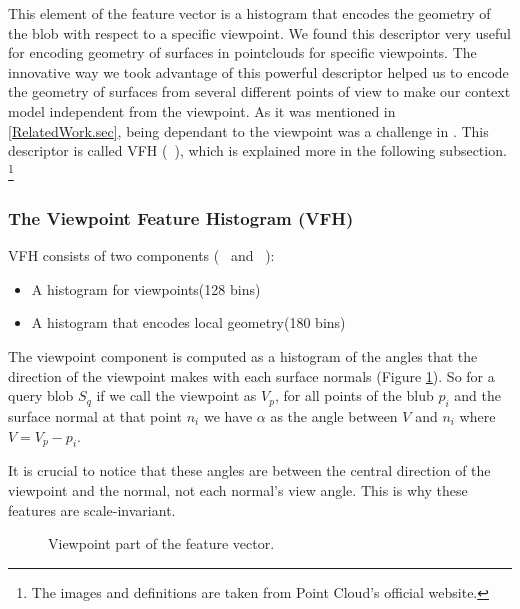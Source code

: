 This element of the feature vector is a histogram that encodes the geometry of the blob with respect to a specific viewpoint. We found this descriptor very useful for encoding geometry of surfaces in pointclouds for specific viewpoints. The innovative way we took advantage of this powerful descriptor helped us to encode the geometry of surfaces from several different points of view to make our context model independent from the viewpoint. As it was mentioned in \ref{RelatedWork.sec}, being dependant to the viewpoint was a challenge in \cite{aydemir2012_3Dcontext}.
This descriptor is called VFH (~\cite{5651280}), which is explained more in the following subsection. \footnote{The images and definitions are taken from Point Cloud's official website.}

\subsubsection*{The Viewpoint Feature Histogram (VFH)}
\label{VFH.ssec}
 

VFH consists of two components (~\cite{VFH_Definition} and ~\cite{5651280}):


\begin{itemize}
 \item A histogram for viewpoints(128 bins)
 \item A histogram that encodes local geometry(180 bins)
\end{itemize}

The viewpoint component is computed as a histogram of the angles that the direction of the viewpoint  makes with each surface
normals (Figure \ref{VFH_ViewPoint_component.figure}). So for a query blob $S_q$ if we call the viewpoint as $V_p$, for all points of the blub $p_i$ and the surface normal at that point $n_i$ we have $\alpha$ as the angle between $V$ and $n_i$ where $V = V_p - p_i$.


It is crucial to notice that these angles are between the central direction of the viewpoint and the normal, not each normal's view angle. This is why these features are scale-invariant.  

\begin{figure}[t]
  \caption[Viewpoint Component of VFH]
  {Viewpoint part of the feature vector.\cite{VFH_Definition}}
  \label{VFH_ViewPoint_component.figure}
\end{figure}

